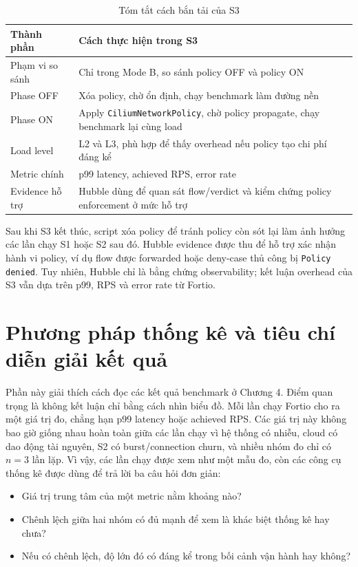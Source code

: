 \begin{table}[H]
\centering
\caption{Tóm tắt cách bắn tải của S3}
\label{tab:s3-policy-profile}
\small
\renewcommand{\arraystretch}{1.15}
\begin{tabularx}{\textwidth}{>{\raggedright\arraybackslash}p{3.0cm}X}
\toprule
\textbf{Thành phần} & \textbf{Cách thực hiện trong S3} \\
\midrule
Phạm vi so sánh & Chỉ trong Mode B, so sánh policy OFF và policy ON \\
Phase OFF & Xóa policy, chờ ổn định, chạy benchmark làm đường nền \\
Phase ON & Apply \texttt{CiliumNetworkPolicy}, chờ policy propagate, chạy benchmark lại cùng load \\
Load level & L2 và L3, phù hợp để thấy overhead nếu policy tạo chi phí đáng kể \\
Metric chính & p99 latency, achieved RPS, error rate \\
Evidence hỗ trợ & Hubble dùng để quan sát flow/verdict và kiểm chứng policy enforcement ở mức hỗ trợ \\
\bottomrule
\end{tabularx}
\end{table}

Sau khi S3 kết thúc, script xóa policy để tránh policy còn sót lại làm ảnh hưởng các lần chạy S1 hoặc S2 sau đó. Hubble evidence được thu để hỗ trợ xác nhận hành vi policy, ví dụ flow được forwarded hoặc deny-case thủ công bị \texttt{Policy denied}. Tuy nhiên, Hubble chỉ là bằng chứng observability; kết luận overhead của S3 vẫn dựa trên p99, RPS và error rate từ Fortio.

\section{Phương pháp thống kê và tiêu chí diễn giải kết quả}
\label{sec:statistics-plan}

Phần này giải thích cách đọc các kết quả benchmark ở Chương 4. Điểm quan trọng là không kết luận chỉ bằng cách nhìn biểu đồ. Mỗi lần chạy Fortio cho ra một giá trị đo, chẳng hạn p99 latency hoặc achieved RPS. Các giá trị này không bao giờ giống nhau hoàn toàn giữa các lần chạy vì hệ thống có nhiễu, cloud có dao động tài nguyên, S2 có burst/connection churn, và nhiều nhóm đo chỉ có \(n=3\) lần lặp. Vì vậy, các lần chạy được xem như một mẫu đo, còn các công cụ thống kê được dùng để trả lời ba câu hỏi đơn giản:

\begin{itemize}
  \item Giá trị trung tâm của một metric nằm khoảng nào?
  \item Chênh lệch giữa hai nhóm có đủ mạnh để xem là khác biệt thống kê hay chưa?
  \item Nếu có chênh lệch, độ lớn đó có đáng kể trong bối cảnh vận hành hay không?
\end{itemize}


